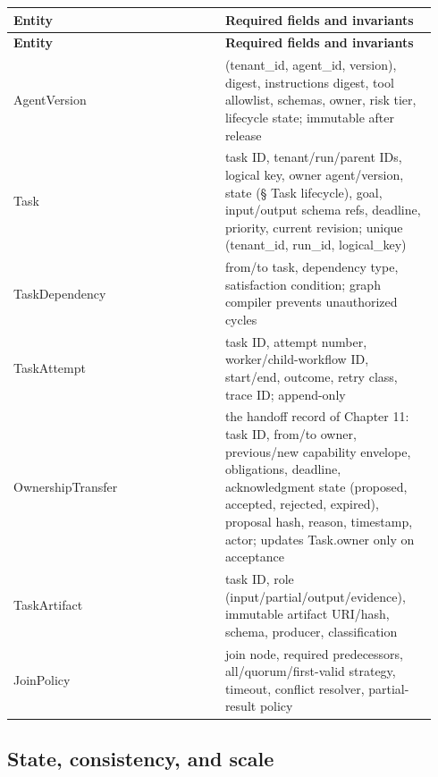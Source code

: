 \BookTableStart
\small
\begin{longtable}{@{}Y{0.4700\linewidth}Y{0.4700\linewidth}@{}}
\color{white}\bfseries \textbf{Entity} & \color{white}\bfseries \textbf{Required fields and invariants} \\
\endfirsthead
{}
\color{white}\bfseries \textbf{Entity} & \color{white}\bfseries \textbf{Required fields and invariants} \\
\endhead
AgentVersion & (tenant\_id, agent\_id, version), digest, instructions digest, tool allowlist, schemas, owner, risk tier, lifecycle state; immutable after release \\
Task & task ID, tenant/run/parent IDs, logical key, owner agent/version, state (§ Task lifecycle), goal, input/output schema refs, deadline, priority, current revision; unique (tenant\_id, run\_id, logical\_key) \\
TaskDependency & from/to task, dependency type, satisfaction condition; graph compiler prevents unauthorized cycles \\
TaskAttempt & task ID, attempt number, worker/child-workflow ID, start/end, outcome, retry class, trace ID; append-only \\
OwnershipTransfer & the handoff record of Chapter 11: task ID, from/to owner, previous/new capability envelope, obligations, deadline, acknowledgment state (proposed, accepted, rejected, expired), proposal hash, reason, timestamp, actor; updates Task.owner only on acceptance \\
TaskArtifact & task ID, role (input/partial/output/evidence), immutable artifact URI/hash, schema, producer, classification \\
JoinPolicy & join node, required predecessors, all/quorum/first-valid strategy, timeout, conflict resolver, partial-result policy \\
\end{longtable}
\BookTableEnd

\subsection{State, consistency, and scale}

